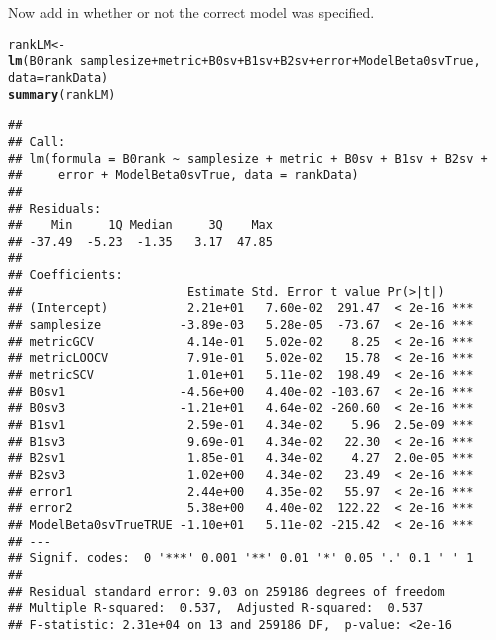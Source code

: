 \documentclass{article}\usepackage[]{graphicx}\usepackage[]{color}
\makeatletter
\newcommand{\hlopt}[1]{\textcolor[rgb]{0,0,0}{#1}}%
\newcommand{\hlstd}[1]{\textcolor[rgb]{0.345,0.345,0.345}{#1}}%
\newcommand{\hlkwb}[1]{\textcolor[rgb]{0.69,0.353,0.396}{#1}}%
\newcommand{\hlkwc}[1]{\textcolor[rgb]{0.333,0.667,0.333}{#1}}%
\newcommand{\hlkwd}[1]{\textcolor[rgb]{0.737,0.353,0.396}{\textbf{#1}}}%
\newenvironment{kframe}{%
 \def\at@end@of@kframe{}%
 \ifinner\ifhmode%
  \def\at@end@of@kframe{\end{minipage}}%
  \begin{minipage}{\columnwidth}%
 \fi\fi%
 \def\FrameCommand##1{\hskip\@totalleftmargin \hskip-\fboxsep
 \colorbox{shadecolor}{##1}\hskip-\fboxsep
     \hskip-\linewidth \hskip-\@totalleftmargin \hskip\columnwidth}%
 \MakeFramed {\advance\hsize-\width
   \@totalleftmargin\z@ \linewidth\hsize
   \@setminipage}}%
 {\par\unskip\endMakeFramed%
 \at@end@of@kframe}
\newenvironment{knitrout}{}{} %
\makeatother
\begin{document}
Now add in whether or not the correct model was specified.
\begin{knitrout}
\color{fgcolor}\begin{kframe}
\begin{alltt}
\hlstd{rankLM} \hlkwb{<-} \hlkwd{lm}\hlstd{(B0rank} \hlopt{~} \hlstd{samplesize} \hlopt{+} \hlstd{metric} \hlopt{+} \hlstd{B0sv} \hlopt{+} \hlstd{B1sv} \hlopt{+} \hlstd{B2sv} \hlopt{+} \hlstd{error} \hlopt{+} \hlstd{ModelBeta0svTrue,}
    \hlkwc{data} \hlstd{= rankData)}
\hlkwd{summary}\hlstd{(rankLM)}
\end{alltt}
\begin{verbatim}
## 
## Call:
## lm(formula = B0rank ~ samplesize + metric + B0sv + B1sv + B2sv + 
##     error + ModelBeta0svTrue, data = rankData)
## 
## Residuals:
##    Min     1Q Median     3Q    Max 
## -37.49  -5.23  -1.35   3.17  47.85 
## 
## Coefficients:
##                       Estimate Std. Error t value Pr(>|t|)    
## (Intercept)           2.21e+01   7.60e-02  291.47  < 2e-16 ***
## samplesize           -3.89e-03   5.28e-05  -73.67  < 2e-16 ***
## metricGCV             4.14e-01   5.02e-02    8.25  < 2e-16 ***
## metricLOOCV           7.91e-01   5.02e-02   15.78  < 2e-16 ***
## metricSCV             1.01e+01   5.11e-02  198.49  < 2e-16 ***
## B0sv1                -4.56e+00   4.40e-02 -103.67  < 2e-16 ***
## B0sv3                -1.21e+01   4.64e-02 -260.60  < 2e-16 ***
## B1sv1                 2.59e-01   4.34e-02    5.96  2.5e-09 ***
## B1sv3                 9.69e-01   4.34e-02   22.30  < 2e-16 ***
## B2sv1                 1.85e-01   4.34e-02    4.27  2.0e-05 ***
## B2sv3                 1.02e+00   4.34e-02   23.49  < 2e-16 ***
## error1                2.44e+00   4.35e-02   55.97  < 2e-16 ***
## error2                5.38e+00   4.40e-02  122.22  < 2e-16 ***
## ModelBeta0svTrueTRUE -1.10e+01   5.11e-02 -215.42  < 2e-16 ***
## ---
## Signif. codes:  0 '***' 0.001 '**' 0.01 '*' 0.05 '.' 0.1 ' ' 1
## 
## Residual standard error: 9.03 on 259186 degrees of freedom
## Multiple R-squared:  0.537,	Adjusted R-squared:  0.537 
## F-statistic: 2.31e+04 on 13 and 259186 DF,  p-value: <2e-16
\end{verbatim}
\end{kframe}
\end{knitrout}
\end{document}
